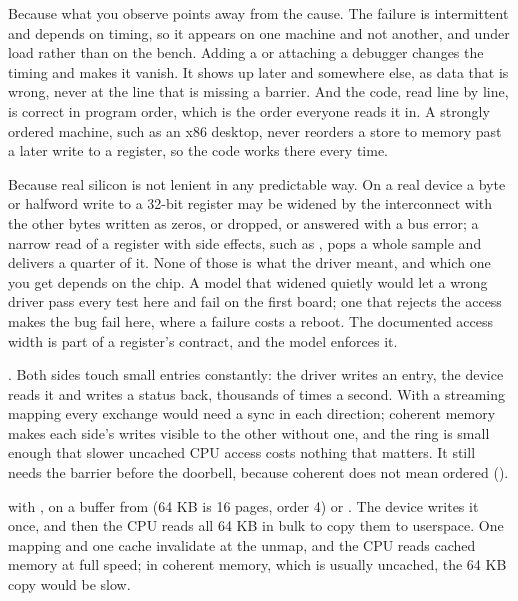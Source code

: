  Because what you observe points away from the cause. The failure is intermittent and
depends on timing, so it appears on one machine and not another, and under load rather than on the
bench. Adding a  or attaching a debugger changes the timing and makes it vanish. It
shows up later and somewhere else, as data that is wrong, never at the line that is missing a
barrier. And the code, read line by line, is correct in program order, which is the order everyone
reads it in. A strongly ordered machine, such as an x86 desktop, never reorders a store to memory
past a later write to a register, so the code works there every time.

 Because real silicon is not lenient in any predictable way. On a real device a byte or
halfword write to a 32-bit register may be widened by the interconnect with the other bytes written
as zeros, or dropped, or answered with a bus error; a narrow read of a register with side effects,
such as , pops a whole sample and delivers a quarter of it. None of those is what the
driver meant, and which one you get depends on the chip. A model that widened quietly would let a
wrong driver pass every test here and fail on the first board; one that rejects the access makes
the bug fail here, where a failure costs a reboot. The documented access width is part of a
register's contract, and the model enforces it.


 . Both sides touch small entries constantly: the driver writes
an entry, the device reads it and writes a status back, thousands of times a second. With a
streaming mapping every exchange would need a sync in each direction; coherent memory makes each
side's writes visible to the other without one, and the ring is small enough that slower uncached
CPU access costs nothing that matters. It still needs the  barrier before the doorbell,
because coherent does not mean ordered ().

  with , on a buffer from  (64 KB
is 16 pages, order 4) or . The device writes it once, and then the CPU reads all
64 KB in bulk to copy them to userspace. One mapping and one cache invalidate at the unmap, and the
CPU reads cached memory at full speed; in coherent memory, which is usually uncached, the 64 KB copy
would be slow.

